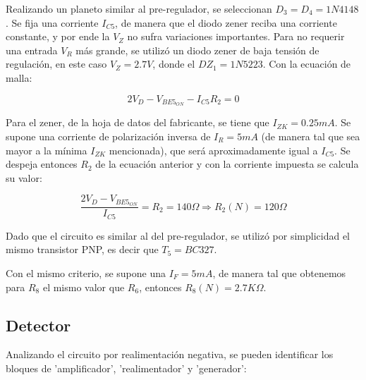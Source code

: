 Realizando un planeto similar al pre-regulador, se seleccionan $D_3 = D_4 = 1N4148$. Se fija una corriente $I_{C5}$, de manera que el diodo zener reciba una corriente constante, y por ende la $V_Z$ no sufra variaciones importantes. Para no requerir una entrada $V_R$ m\'as grande, se utiliz\'o un diodo zener de baja tensi\'on de regulaci\'on, en este caso $V_Z = 2.7V$, donde el $DZ_1 = 1N5223$. Con la ecuaci\'on de malla:

$$2V_D - V_{BE5_{ON}} - I_{C5}R_2 = 0$$

Para el zener, de la hoja de datos del fabricante, se tiene que $I_{ZK} = 0.25mA$. Se supone una corriente de polarizaci\'on inversa de $I_R = 5mA$ (de manera tal que sea mayor a la m\'inima $I_{ZK}$ mencionada), que ser\'a aproximadamente igual a $I_{C5}$. Se despeja entonces $R_2$ de la ecuaci\'on anterior y con la corriente impuesta se calcula su valor:

$$\frac{2V_D - V_{BE5_{ON}}}{I_{C5}} = R_2 = 140\Omega \Longrightarrow R_2(N) = 120\Omega$$

Dado que el circuito es similar al del pre-regulador, se utiliz\'o por simplicidad el mismo transistor PNP, es decir que $T_5 = BC327$.

Con el mismo criterio, se supone una $I_F = 5mA$, de manera tal que obtenemos para $R_8$ el mismo valor que $R_6$, entonces $R_8(N) = 2.7K\Omega$.

\newpage

\subsection{Detector}

Analizando el circuito por realimentaci\'on negativa, se pueden identificar los bloques de 'amplificador', 'realimentador' y 'generador':

